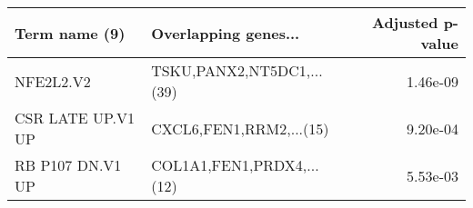 \begin{tabular}{llr}
\toprule
    Term name (9) &      Overlapping genes... &  Adjusted p-value \\
\midrule
        NFE2L2.V2 & TSKU,PANX2,NT5DC1,...(39) &          1.46e-09 \\
CSR LATE UP.V1 UP &   CXCL6,FEN1,RRM2,...(15) &          9.20e-04 \\
 RB P107 DN.V1 UP & COL1A1,FEN1,PRDX4,...(12) &          5.53e-03 \\
\bottomrule
\end{tabular}
